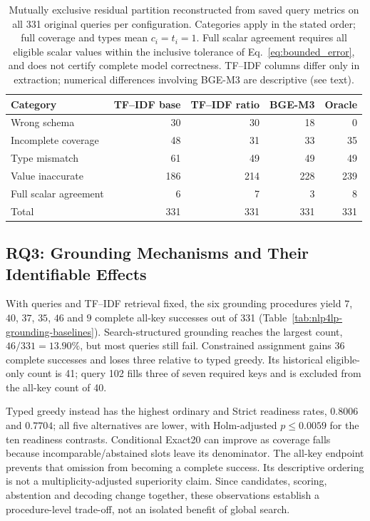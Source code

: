 \documentclass[pdflatex,iicol,sn-basic,Numbered]{sn-jnl}
\begin{document}
\begin{table}[t]
  \centering
  \renewcommand{\arraystretch}{1.18}
  \caption{Mutually exclusive residual partition reconstructed from saved query metrics on all 331 original queries per configuration. Categories apply in the stated order; full coverage and types mean $c_i=t_i=1$. Full scalar agreement requires all eligible scalar values within the inclusive tolerance of Eq.~\eqref{eq:bounded_error}, and does not certify complete model correctness. TF--IDF columns differ only in extraction; numerical differences involving BGE-M3 are descriptive (see text).}
  \label{tab:nlp4lp-error-taxonomy}
  \small
  \setlength{\tabcolsep}{4pt}
  \begin{tabular}{lrrrr}
    \toprule
    Category & TF--IDF base & TF--IDF ratio & BGE-M3 & Oracle \\
    \midrule
Wrong schema & 30 & 30 & 18 & 0 \\
Incomplete coverage & 48 & 31 & 33 & 35 \\
Type mismatch & 61 & 49 & 49 & 49 \\
Value inaccurate & 186 & 214 & 228 & 239 \\
Full scalar agreement & 6 & 7 & 3 & 8 \\
Total & 331 & 331 & 331 & 331 \\
    \bottomrule
  \end{tabular}
\end{table}

\subsection{RQ3: Grounding Mechanisms and Their Identifiable Effects}
\label{subsec:exp_grounding_baselines}
With queries and TF--IDF retrieval fixed, the six grounding procedures yield $7$, $40$, $37$, $35$, $46$ and $9$ complete all-key successes out of 331 (Table~\ref{tab:nlp4lp-grounding-baselines}). Search-structured grounding reaches the largest count, $46/331=13.90\%$, but most queries still fail. Constrained assignment gains 36 complete successes and loses three relative to typed greedy. Its historical eligible-only count is 41; query 102 fills three of seven required keys and is excluded from the all-key count of 40.

Typed greedy instead has the highest ordinary and Strict readiness rates, $0.8006$ and $0.7704$; all five alternatives are lower, with Holm-adjusted $p\leq0.0059$ for the ten readiness contrasts. Conditional Exact20 can improve as coverage falls because incomparable/abstained slots leave its denominator. The all-key endpoint prevents that omission from becoming a complete success. Its descriptive ordering is not a multiplicity-adjusted superiority claim. Since candidates, scoring, abstention and decoding change together, these observations establish a procedure-level trade-off, not an isolated benefit of global search.
\end{document}
